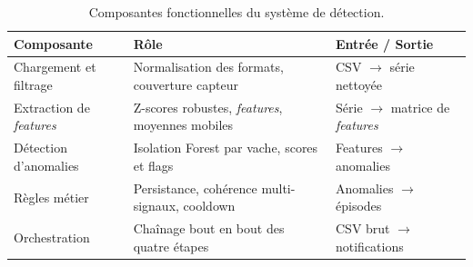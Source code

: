 \begin{table}[H]
    \centering
    \small
    \caption{Composantes fonctionnelles du système de détection.}
    \label{tab:modules}
    \begin{tabular}{>{\raggedright\arraybackslash}p{3.0cm}
                    >{\raggedright\arraybackslash}p{6.3cm}
                    >{\raggedright\arraybackslash}p{3.8cm}}
        \toprule
        \textbf{Composante} & \textbf{Rôle} & \textbf{Entrée / Sortie} \\
        \midrule
        Chargement et filtrage & Normalisation des formats, couverture capteur & CSV $\rightarrow$ série nettoyée \\
        Extraction de \textit{features} & Z-scores robustes, \textit{features}, moyennes mobiles & Série $\rightarrow$ matrice de \textit{features} \\
        Détection d'anomalies & Isolation Forest par vache, scores et flags & Features $\rightarrow$ anomalies \\
        Règles métier & Persistance, cohérence multi-signaux, cooldown & Anomalies $\rightarrow$ épisodes \\
        Orchestration & Chaînage bout en bout des quatre étapes & CSV brut $\rightarrow$ notifications \\
        \bottomrule
    \end{tabular}
\end{table}

